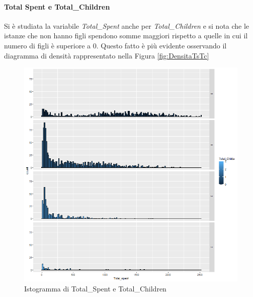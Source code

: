 \documentclass[letterpaper,11pt]{article}
\begin{document}
\paragraph{Total Spent e Total\_Children}
Si è studiata la variabile \textit{Total\_Spent} anche per \textit{Total\_Children} e si nota che le istanze che non hanno figli spendono somme maggiori rispetto a quelle in cui il numero di figli è superiore a 0. Questo fatto è più evidente osservando il diagramma di densità rappresentato nella Figura \ref{fig:DensitaTsTc}


\begin{figure}[h]
  \centering
  \begin{minipage}[b]{0.4\textwidth}
    \includegraphics[width=\textwidth]{Img/EDA/EDA030.png}
    \caption{Istogramma di Total\_Spent e Total\_Children}
    \label{fig:IstogrammaTsTc}
  \end{minipage}
  \hfill
  \begin{minipage}[b]{0.4\textwidth}

\end{minipage}
\end{figure}
\end{document}
